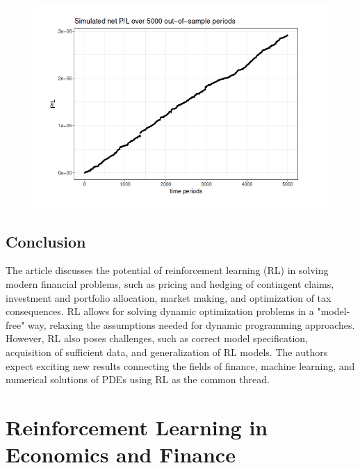 \documentclass{article}
\begin{document}
\begin{figure}[H]
\begin{center}
\includegraphics[scale = 0.5]{Sam.png}
\end{center}
\end{figure}

\subsection{Conclusion}
The article discusses the potential of reinforcement learning (RL) in solving modern financial problems, such as pricing and hedging of contingent claims, investment and portfolio allocation, market making, and optimization of tax consequences. RL allows for solving dynamic optimization problems in a "model-free" way, relaxing the assumptions needed for dynamic programming approaches. However, RL also poses challenges, such as correct model specification, acquisition of sufficient data, and generalization of RL models. The authors expect exciting new results connecting the fields of finance, machine learning, and numerical solutions of PDEs using RL as the common thread.

\section{Reinforcement Learning in Economics and Finance}
\end{document}
